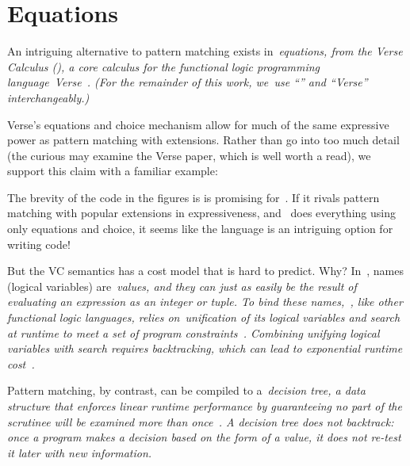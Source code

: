 \documentclass[article,screen,12pt, nonacm]{acmart}
\begin{document}
    \section{Equations}

    An intriguing alternative to pattern matching exists in~\it{equations}, from
    the Verse Calculus (\VC), a core calculus for the functional logic
    programming language~\it{Verse}~\citep{antoy2010functional,
    hanus2013functional, verse}. (For the remainder of this work, we~use “\VC”
    and “Verse” interchangeably.)

    Verse's equations and choice mechanism allow for much of the same expressive
    power as pattern matching with extensions. Rather than go into too much
    detail (the curious may examine the Verse paper, which is well worth a
    read), we support this claim with a familiar example: 


    The brevity of the code in the figures is is promising for~\VC. If it rivals
    pattern matching with popular extensions in expressiveness, and~\VC
    does everything using only equations and choice, it seems like the language
    is an intriguing option for writing code! 


    But the VC semantics has a cost model that is hard to predict. Why? In~\VC,
    names (logical variables) are~\it{values}, and they can just as easily be
    the result of evaluating an expression as an integer or tuple. To bind these
    names,~\VC, like other functional logic languages, relies
    on~\it{unification} of its logical variables and \it{search} at runtime to
    meet a set of program constraints~\citep{antoy2010functional,
    hanus2013functional}. Combining unifying logical variables with search
    requires backtracking, which can lead to exponential runtime
    cost~\citep{hanus2013functional, wadler1985replace, clark1982introduction}. 


    Pattern matching, by contrast, can be compiled to a~\it{decision tree}, a
    data structure that enforces linear runtime performance by guaranteeing no
    part of the scrutinee will be examined more than once~\citep{maranget}. A
    decision tree does not backtrack: once a program makes a decision based on
    the form of a value, it does not re-test it later with new information. 
    
\end{document}
